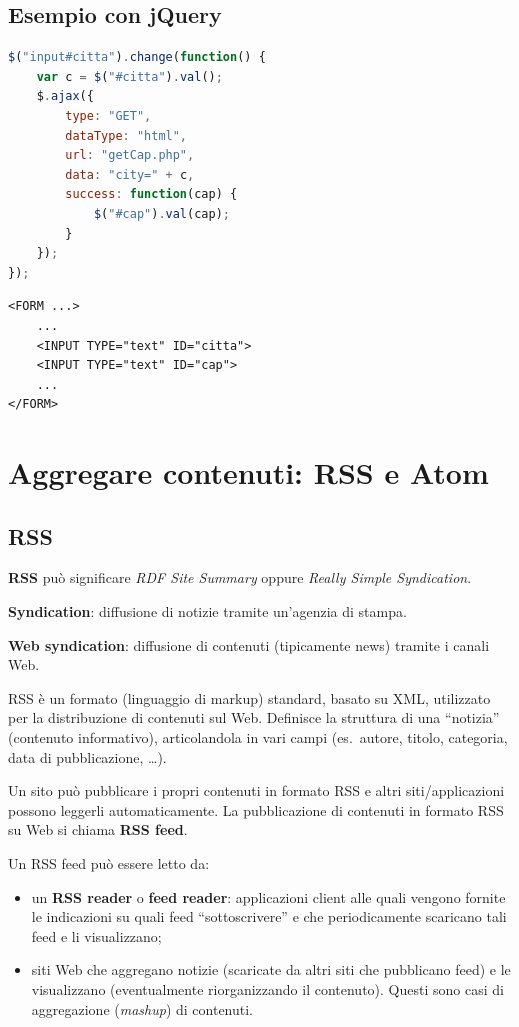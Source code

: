 \subsection{Esempio con jQuery}

\begin{lstlisting}[language=JavaScript]
$("input#citta").change(function() {
    var c = $("#citta").val();
    $.ajax({
        type: "GET",
        dataType: "html",
        url: "getCap.php",
        data: "city=" + c,
        success: function(cap) {
            $("#cap").val(cap);
        }
    });
});
\end{lstlisting}

\begin{lstlisting}[language=HTML5]
<FORM ...>
    ...
    <INPUT TYPE="text" ID="citta">
    <INPUT TYPE="text" ID="cap">
    ...
</FORM>
\end{lstlisting}

\section{Aggregare contenuti: RSS e Atom}

\subsection{RSS}

\textbf{RSS} può significare \textit{RDF Site Summary} oppure \textit{Really Simple Syndication}.

\textbf{Syndication}: diffusione di notizie tramite un'agenzia di stampa.

\textbf{Web syndication}: diffusione di contenuti (tipicamente news) tramite i canali Web.

RSS è un formato (linguaggio di markup) standard, basato su XML, utilizzato per la distribuzione di contenuti sul Web. Definisce la struttura di una ``notizia'' (contenuto informativo), articolandola in vari campi (es.\ autore, titolo, categoria, data di pubblicazione, \dots).

Un sito può pubblicare i propri contenuti in formato RSS e altri siti/applicazioni possono leggerli automaticamente. La pubblicazione di contenuti in formato RSS su Web si chiama \textbf{RSS feed}.

Un RSS feed può essere letto da:
\begin{itemize}
    \item un \textbf{RSS reader} o \textbf{feed reader}: applicazioni client alle quali vengono fornite le indicazioni su quali feed ``sottoscrivere'' e che periodicamente scaricano tali feed e li visualizzano;
    \item siti Web che aggregano notizie (scaricate da altri siti che pubblicano feed) e le visualizzano (eventualmente riorganizzando il contenuto). Questi sono casi di aggregazione (\textit{mashup}) di contenuti.
\end{itemize}

